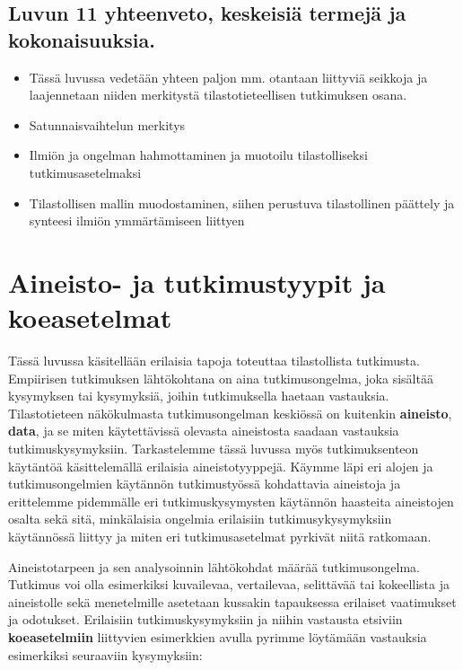 \documentclass[
]{book}
\providecommand{\tightlist}{%
  \setlength{\itemsep}{0pt}\setlength{\parskip}{0pt}}
\begin{document}
\hypertarget{luvun-11-yhteenveto-keskeisiuxe4-termejuxe4-ja-kokonaisuuksia.}{%
\section{Luvun 11 yhteenveto, keskeisiä termejä ja kokonaisuuksia.}\label{luvun-11-yhteenveto-keskeisiuxe4-termejuxe4-ja-kokonaisuuksia.}}

\begin{itemize}
\tightlist
\item
  Tässä luvussa vedetään yhteen paljon mm. otantaan liittyviä seikkoja ja laajennetaan niiden merkitystä tilastotieteellisen tutkimuksen osana.
\item
  Satunnaisvaihtelun merkitys
\item
  Ilmiön ja ongelman hahmottaminen ja muotoilu tilastolliseksi tutkimusasetelmaksi
\item
  Tilastollisen mallin muodostaminen, siihen perustuva tilastollinen päättely ja synteesi ilmiön ymmärtämiseen liittyen
\end{itemize}


\hypertarget{luku12}{%
\chapter{Aineisto- ja tutkimustyypit ja koeasetelmat}\label{luku12}}

Tässä luvussa käsitellään erilaisia tapoja toteuttaa tilastollista tutkimusta. Empiirisen tutkimuksen lähtökohtana on aina tutkimusongelma, joka sisältää kysymyksen tai kysymyksiä, joihin tutkimuksella haetaan vastauksia. Tilastotieteen näkökulmasta tutkimusongelman keskiössä on kuitenkin \textbf{aineisto}, \textbf{data}, ja se miten käytettävissä olevasta aineistosta saadaan vastauksia tutkimuskysymyksiin. Tarkastelemme tässä luvussa myös tutkimuksenteon käytäntöä käsittelemällä erilaisia aineistotyyppejä. Käymme läpi eri alojen ja tutkimusongelmien käytännön tutkimustyössä kohdattavia aineistoja ja erittelemme pidemmälle eri tutkimuskysymysten käytännön haasteita aineistojen osalta sekä sitä, minkälaisia ongelmia erilaisiin tutkimusykysymyksiin käytännössä liittyy ja miten eri tutkimusasetelmat pyrkivät niitä ratkomaan.

Aineistotarpeen ja sen analysoinnin lähtökohdat määrää tutkimusongelma. Tutkimus voi olla esimerkiksi kuvailevaa, vertailevaa, selittävää tai kokeellista ja aineistolle sekä menetelmille asetetaan kussakin tapauksessa erilaiset vaatimukset ja odotukset. Erilaisiin tutkimuskysymyksiin ja niihin vastausta etsiviin \textbf{koeasetelmiin} liittyvien esimerkkien avulla pyrimme löytämään vastauksia esimerkiksi seuraaviin kysymyksiin:
\end{document}

